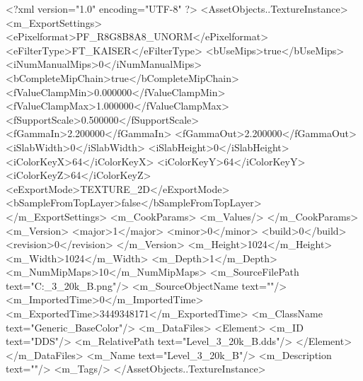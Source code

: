 <?xml version="1.0" encoding="UTF-8" ?>
<AssetObjects..TextureInstance>
	<m_ExportSettings>
		<ePixelformat>PF_R8G8B8A8_UNORM</ePixelformat>
		<eFilterType>FT_KAISER</eFilterType>
		<bUseMips>true</bUseMips>
		<iNumManualMips>0</iNumManualMips>
		<bCompleteMipChain>true</bCompleteMipChain>
		<fValueClampMin>0.000000</fValueClampMin>
		<fValueClampMax>1.000000</fValueClampMax>
		<fSupportScale>0.500000</fSupportScale>
		<fGammaIn>2.200000</fGammaIn>
		<fGammaOut>2.200000</fGammaOut>
		<iSlabWidth>0</iSlabWidth>
		<iSlabHeight>0</iSlabHeight>
		<iColorKeyX>64</iColorKeyX>
		<iColorKeyY>64</iColorKeyY>
		<iColorKeyZ>64</iColorKeyZ>
		<eExportMode>TEXTURE_2D</eExportMode>
		<bSampleFromTopLayer>false</bSampleFromTopLayer>
	</m_ExportSettings>
	<m_CookParams>
		<m_Values/>
	</m_CookParams>
	<m_Version>
		<major>1</major>
		<minor>0</minor>
		<build>0</build>
		<revision>0</revision>
	</m_Version>
	<m_Height>1024</m_Height>
	<m_Width>1024</m_Width>
	<m_Depth>1</m_Depth>
	<m_NumMipMaps>10</m_NumMipMaps>
	<m_SourceFilePath text="C:\Users\Shadow\Desktop\Prototypes\Level_3_20k_B.png"/>
	<m_SourceObjectName text=""/>
	<m_ImportedTime>0</m_ImportedTime>
	<m_ExportedTime>3449348171</m_ExportedTime>
	<m_ClassName text="Generic_BaseColor"/>
	<m_DataFiles>
		<Element>
			<m_ID text="DDS"/>
			<m_RelativePath text="Level_3_20k_B.dds"/>
		</Element>
	</m_DataFiles>
	<m_Name text="Level_3_20k_B"/>
	<m_Description text=""/>
	<m_Tags/>
</AssetObjects..TextureInstance>

